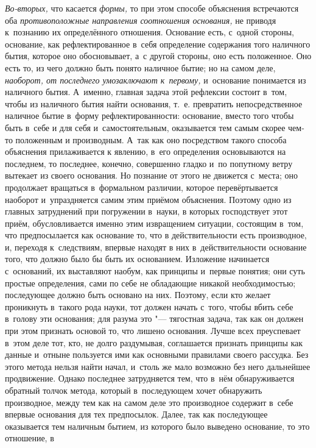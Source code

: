 {\em Во-вторых,} что касается {\em формы,} то при этом способе объяснения
встречаются оба {\em противоположные направления соотношения основания,} не
приводя к~познанию их определённого отношения. Основание есть, с~одной стороны,
основание, как рефлектированное в~себя определение содержания того наличного
бытия, которое оно обосновывает, а~с другой стороны, оно есть положенное. Оно
есть то, из чего должно быть понято наличное бытие; но на самом деле,
{\em наоборот, от последнего умозаключают к~первому,} и~основание понимается из
наличного бытия. А~именно, главная задача этой рефлексии состоит в~том, чтобы
из наличного бытия найти основания, т.~е. превратить непосредственное наличное
бытие в~форму рефлектированности: основание, вместо того чтобы быть в~себе и
для себя и~самостоятельным, оказывается тем самым скорее чем-то положенным и
производным. А~так как оно посредством такого способа объяснения прилаживается
к явлению, в~его определения основываются на последнем, то последнее, конечно,
совершенно гладко и~по попутному ветру вытекает из своего основания. Но
познание от этого не движется с~места; оно продолжает вращаться в~формальном
различии, которое перевёртывается наоборот и~упраздняется самим этим приёмом
объяснения. Поэтому одно из главных затруднений при погружении в~науки, в
которых господствует этот приём, обусловливается именно этим извращением
ситуации, состоящим в~том, что предпосылается как основание то, что в
действительности есть производное, и, переходя к~следствиям, впервые находят в
них в~действительности основание того, что должно было бы быть их основанием.
Изложение начинается с~оснований, их выставляют наобум, как принципы и~первые
понятия; они суть простые определения, сами по себе не обладающие никакой
необходимостью; последующее должно быть основано на них. Поэтому, если кто
желает проникнуть в~такого рода науки, тот должен начать с~того, чтобы вбить
себе в~голову эти основания; для разума это "--- тягостная задача, так как он
должен при этом признать основой то, что лишено основания. Лучше всех
преуспевает в~этом деле тот, кто, не долго раздумывая, соглашается признать
принципы как данные и~отныне пользуется ими как основными правилами своего
рассудка. Без этого метода нельзя найти начал, и~столь же мало возможно без
него дальнейшее продвижение. Однако последнее затрудняется тем, что в~нём
обнаруживается обратный толчок метода, который в~последующем хочет обнаружить
производное, между тем как на самом деле это производное содержит в~себе
впервые основания для тех предпосылок. Далее, так как последующее оказывается
тем наличным бытием, из которого было выведено основание, то это отношение, в

